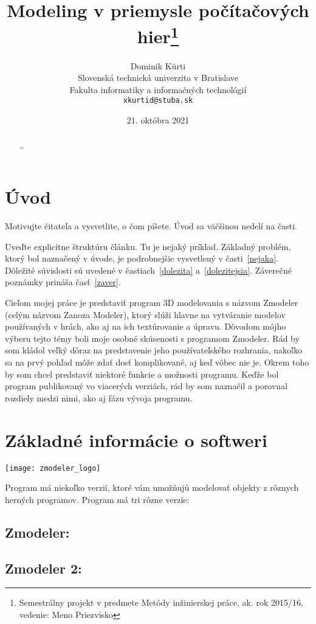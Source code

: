\documentclass[10pt,twoside,slovak,a4paper]{article}
\title{Modeling v priemysle počítačových hier\thanks{Semestrálny projekt v predmete Metódy inžinierskej práce, ak. rok 2015/16, vedenie: Meno Priezvisko}} %
\author{Dominik Kürti\\[2pt]
	{\small Slovenská technická univerzita v Bratislave}\\
	{\small Fakulta informatiky a informačných technológií}\\
	{\small \texttt{xkurtid@stuba.sk}}
	}
\date{\small 21. októbra 2021} %
\begin{document}
\maketitle

\begin{abstract}
\ldots
\end{abstract}



\section{Úvod}

Motivujte čitateľa a vysvetlite, o čom píšete. Úvod sa väčšinou nedelí na časti.

Uveďte explicitne štruktúru článku. Tu je nejaký príklad.
Základný problém, ktorý bol naznačený v úvode, je podrobnejšie vysvetlený v časti~\ref{nejaka}.
Dôležité súvislosti sú uvedené v častiach~\ref{dolezita} a~\ref{dolezitejsia}.
Záverečné poznámky prináša časť~\ref{zaver}.

Cieľom mojej práce je predstaviť program 3D modelovania s názvom Zmodeler (celým názvom Zanoza Modeler), ktorý slúži hlavne na vytváranie modelov používaných v hrách, ako aj na ich textúrovanie a úpravu. Dôvodom mójho výberu tejto témy boli moje osobné skúsenosti s programom Zmodeler. Rád by som kládol veľký dôraz na predstavenie jeho používateľského rozhrania, nakoľko sa na prvý pohľad môže zdať dosť komplikované, aj keď vôbec nie je. Okrem toho by som chcel predstaviť niektoré funkcie a možnosti programu. Keďže bol program publikovaný vo viacerých verziách, rád by som naznačil a porovnal rozdiely medzi nimi, ako aj fázu vývoja programu.



\section{Základné informácie o softweri} \label{zakladneinformacie}
\begin{center}
\texttt{[image: zmodeler\_logo]}
\end{center}
Program má niekoľko verzií, ktoré vám umožňujú modelovať objekty z rôznych herných programov. Program má tri rôzne verzie:

\subsection{Zmodeler:} \label{zakladneinformacie:zmodeler}
\subsection{Zmodeler 2:} \label{zakladneinformacie:zmodeler2}
\end{document}
